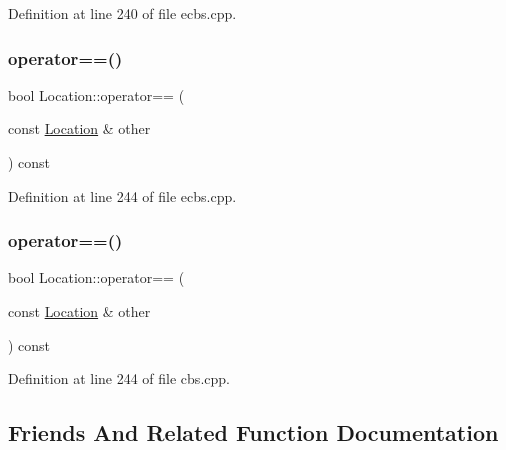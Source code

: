 Definition at line 240 of file ecbs.\+cpp.

\mbox{\label{struct_location_a0c99c1e65cc6607121da4abdb4894b74}} 
\subsubsection{\texorpdfstring{operator==()}{operator==()}\hspace{0.1cm}{\footnotesize\ttfamily [1/2]}}
{\footnotesize\ttfamily bool Location\+::operator== (\begin{DoxyParamCaption}\item[{const \hyperlink{struct_location}{Location} \&}]{other }\end{DoxyParamCaption}) const\hspace{0.3cm}{\ttfamily [inline]}}



Definition at line 244 of file ecbs.\+cpp.

\mbox{\label{struct_location_a0c99c1e65cc6607121da4abdb4894b74}} 
\subsubsection{\texorpdfstring{operator==()}{operator==()}\hspace{0.1cm}{\footnotesize\ttfamily [2/2]}}
{\footnotesize\ttfamily bool Location\+::operator== (\begin{DoxyParamCaption}\item[{const \hyperlink{struct_location}{Location} \&}]{other }\end{DoxyParamCaption}) const\hspace{0.3cm}{\ttfamily [inline]}}



Definition at line 244 of file cbs.\+cpp.



\subsection{Friends And Related Function Documentation}
\mbox{\label{struct_location_a80d23d3abaf3e34d1cb5202feb05f385}} 
